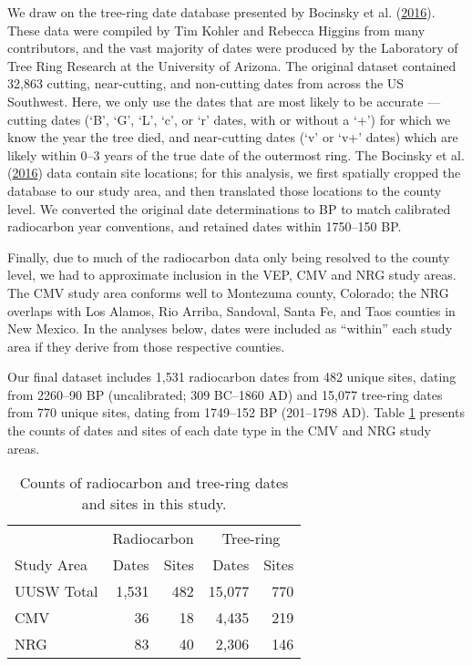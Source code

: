 \documentclass[
]{article}
\begin{document}
We draw on the tree-ring date database presented by Bocinsky et al. (\protect\hyperlink{ref-Bocinsky2016}{2016}). These data were compiled by Tim Kohler and Rebecca Higgins from many contributors, and the vast majority of dates were produced by the Laboratory of Tree Ring Research at the University of Arizona. The original dataset contained 32,863 cutting, near-cutting, and non-cutting dates from across the US Southwest. Here, we only use the dates that are most likely to be accurate --- cutting dates (`B', `G', `L', `c', or `r' dates, with or without a `+') for which we know the year the tree died, and near-cutting dates (`v' or `v+' dates) which are likely within 0--3 years of the true date of the outermost ring. The Bocinsky et al. (\protect\hyperlink{ref-Bocinsky2016}{2016}) data contain site locations; for this analysis, we first spatially cropped the database to our study area, and then translated those locations to the county level. We converted the original date determinations to BP to match calibrated radiocarbon year conventions, and retained dates within 1750--150 BP.

Finally, due to much of the radiocarbon data only being resolved to the county level, we had to approximate inclusion in the VEP, CMV and NRG study areas. The CMV study area conforms well to Montezuma county, Colorado; the NRG overlaps with Los Alamos, Rio Arriba, Sandoval, Santa Fe, and Taos counties in New Mexico. In the analyses below, dates were included as ``within'' each study area if they derive from those respective counties.

Our final dataset includes 1,531 radiocarbon dates from 482 unique sites, dating from 2260--90 BP (uncalibrated; 309 BC--1860 AD) and 15,077 tree-ring dates from 770 unique sites, dating from 1749--152 BP (201--1798 AD). Table \ref{tab:Table1} presents the counts of dates and sites of each date type in the CMV and NRG study areas.

\begin{table}

\caption{\label{tab:Table1}Counts of radiocarbon and tree-ring dates and sites in this study.}
\centering
\begin{tabular}[t]{lrrrr}
\toprule
\multicolumn{1}{c}{ } & \multicolumn{2}{c}{Radiocarbon} & \multicolumn{2}{c}{Tree-ring} \\
\cmidrule(l{3pt}r{3pt}){2-3} \cmidrule(l{3pt}r{3pt}){4-5}
Study Area & Dates & Sites & Dates & Sites\\
\midrule
UUSW Total & 1,531 & 482 & 15,077 & 770\\
CMV & 36 & 18 & 4,435 & 219\\
NRG & 83 & 40 & 2,306 & 146\\
\bottomrule
\end{tabular}
\end{table}
\end{document}
